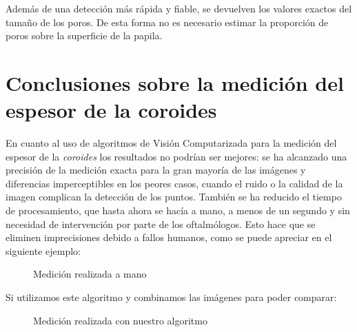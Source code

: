 Además de una detección más rápida y fiable, se devuelven los valores exactos del
tamaño de los poros. De esta forma no es necesario estimar la proporción de poros
sobre la superficie de la papila.

\section{Conclusiones sobre la medición del espesor de la coroides}
En cuanto al uso de algoritmos de Visión Computarizada para la 
medición del espesor de la \emph{\gls{coroides}} los resultados no
podrían ser mejores: se ha alcanzado una precisión de la medición
exacta para la gran mayoría de las imágenes y diferencias 
imperceptibles en los peores casos, cuando el ruido o la calidad
de la imagen complican la detección de los puntos. También se
ha reducido el tiempo de procesamiento, que hasta ahora se hacía
a mano, a menos de un segundo y sin necesidad de intervención
por parte de los oftalmólogos. Esto hace que se eliminen imprecisiones
debido a fallos humanos, como se puede apreciar en el siguiente ejemplo:

    \begin{figure}[H]
      \caption{Medición realizada a mano}
      \centering \setlength\fboxsep{0pt} \setlength\fboxrule{0.5pt}
    \end{figure}

Si utilizamos este algoritmo y combinamos las imágenes para poder
comparar:

    \begin{figure}[H]
      \caption{Medición realizada con nuestro algoritmo}
      \centering \setlength\fboxsep{0pt} \setlength\fboxrule{0.5pt}
    \end{figure}

